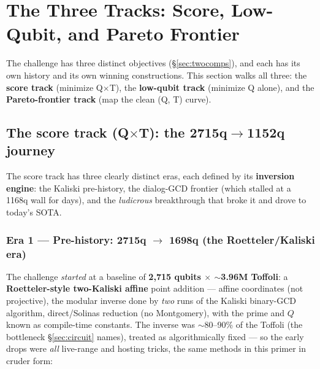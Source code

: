 \documentclass[11pt,a4paper]{article}
\begin{document}
\section{The Three Tracks: Score, Low-Qubit, and Pareto Frontier}
\label{sec:history}

The challenge has three distinct objectives (\S\ref{sec:twocomps}), and each has its own history and
its own winning constructions. This section walks all three: the \textbf{score track} (minimize
Q$\times$T), the \textbf{low-qubit track} (minimize Q alone), and the \textbf{Pareto-frontier track}
(map the clean (Q, T) curve).

\subsection{The score track (Q$\times$T): the 2715q$\to$1152q journey}

The score track has three clearly distinct eras, each defined by its \textbf{inversion engine}: the
Kaliski pre-history, the dialog-GCD frontier (which stalled at a 1168q wall for days), and the
\emph{ludicrous} breakthrough that broke it and drove to today's SOTA.

\subsubsection{Era 1 --- Pre-history: 2715q $\to$ 1698q (the Roetteler/Kaliski era)}

The challenge \emph{started} at a baseline of \textbf{2{,}715 qubits $\times$ $\sim$3.96M Toffoli}: a
\textbf{Roetteler-style two-Kaliski affine} point addition --- affine coordinates (not projective),
the modular inverse done by \emph{two} runs of the Kaliski binary-GCD algorithm, direct/Solinas
reduction (no Montgomery), with the prime and $Q$ known as compile-time constants. The inverse was
$\sim$80--90\% of the Toffoli (the bottleneck \S\ref{sec:circuit} names), treated as algorithmically
fixed --- so the early drops were \emph{all} live-range and hosting tricks, the same methods in this
primer in cruder form:
\end{document}

